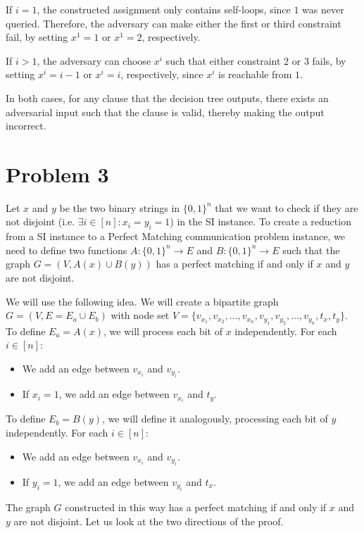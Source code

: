 \documentclass{article}
\begin{document}
If $i = 1$, the constructed assignment only contains self-loops, since $1$ was
never queried. Therefore, the adversary can make either the first or third
constraint fail, by setting $x^1 = 1$ or $x^1 = 2$, respectively.

If $i > 1$, the adversary can choose $x^i$ such that either constraint 2 or
3 fails, by setting $x^i = i - 1$ or $x^i = i$, respectively, since $x^i$ is
reachable from $1$.

In both cases, for any clause that the decision tree outputs, there exists an
adversarial input such that the clause is valid, thereby making the output
incorrect.

\section*{Problem 3}

Let $x$ and $y$ be the two binary strings in $\{0,1\}^n$ that we want to check if they are not disjoint (i.e. $\exists i \in [n]: x_i = y_i = 1$) in the SI instance. To create a reduction from a SI instance to a Perfect Matching communication problem instance, we need to define two functions $A: \{0,1\}^n \to E$ and $B: \{0,1\}^n \to E$ such that the graph $G=(V,A(x)\cup B(y))$ has a perfect matching if and only if $x$ and $y$ are not disjoint.

We will use the following idea. We will create a bipartite graph $G = (V, E = E_a \cup E_b)$ with node set $V = \{v_{x_1}, v_{x_2}, \ldots, v_{x_n}, v_{y_1}, v_{y_2}, \ldots, v_{y_n}, t_x, t_y\}$. To define $E_a = A(x)$, we will process each bit of $x$ independently. For each $i\in [n]$:

\begin{itemize}
    \item We add an edge between $v_{x_i}$ and $v_{y_i}$.
    \item If $x_i = 1$, we add an edge between $v_{x_i}$ and $t_y$.
\end{itemize}

To define $E_b = B(y)$, we will define it analogously, processing each bit of $y$ independently. For each $i\in [n]$:

\begin{itemize}
    \item We add an edge between $v_{x_i}$ and $v_{y_i}$.
    \item If $y_i = 1$, we add an edge between $v_{y_i}$ and $t_x$.
\end{itemize}

The graph $G$ constructed in this way has a perfect matching if and only if $x$ and $y$ are not disjoint. Let us look at the two directions of the proof.
\end{document}

